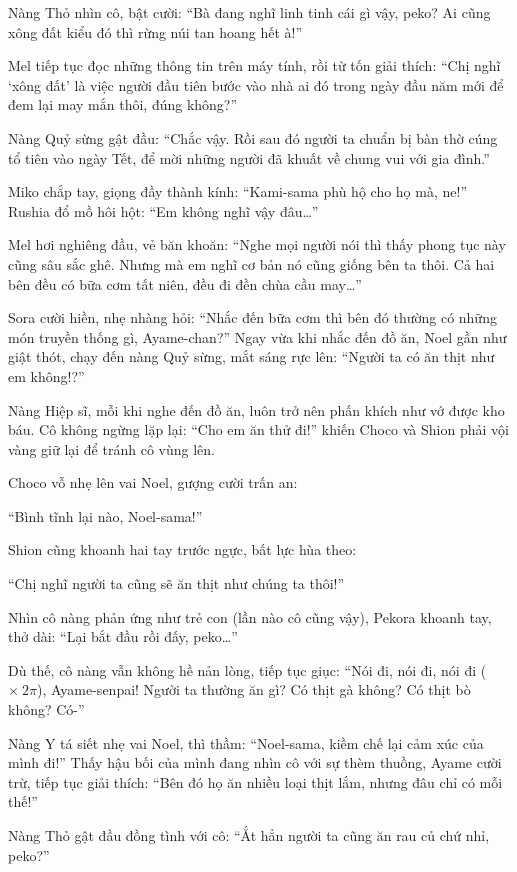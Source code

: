\documentclass[../main.tex]{subfiles}
\begin{document}
Nàng Thỏ nhìn cô, bật cười: ``Bà đang nghĩ linh tinh cái gì vậy, peko? Ai cũng xông đất kiểu đó thì rừng núi tan hoang hết à!''

Mel tiếp tục đọc những thông tin trên máy tính, rồi từ tốn giải thích: ``Chị nghĩ `xông đất' là việc người đầu tiên bước vào nhà ai đó trong ngày đầu năm mới để đem lại may mắn thôi, đúng không?''

Nàng Quỷ sừng gật đầu: ``Chắc vậy. Rồi sau đó người ta chuẩn bị bàn thờ cúng tổ tiên vào ngày Tết, để mời những người đã khuất về chung vui với gia đình.''

Miko chắp tay, giọng đầy thành kính: ``Kami-sama phù hộ cho họ mà, ne!'' Rushia đổ mồ hôi hột: ``Em không nghĩ vậy đâu\dots''

Mel hơi nghiêng đầu, vẻ băn khoăn: ``Nghe mọi người nói thì thấy phong tục này cũng sâu sắc ghê. Nhưng mà em nghĩ cơ bản nó cũng giống bên ta thôi. Cả hai bên đều có bữa cơm tất niên, đều đi đền chùa cầu may\dots''

Sora cười hiền, nhẹ nhàng hỏi: ``Nhắc đến bữa cơm thì bên đó thường có những món truyền thống gì, Ayame-chan?'' Ngay vừa khi nhắc đến đồ ăn, Noel gần như giật thót, chạy đến nàng Quỷ sừng, mắt sáng rực lên: ``Người ta có ăn thịt như em không!?''

Nàng Hiệp sĩ, mỗi khi nghe đến đồ ăn, luôn trở nên phấn khích như vớ được kho báu. Cô không ngừng lặp lại: ``Cho em ăn thử đi!'' khiến Choco và Shion phải vội vàng giữ lại để tránh cô vùng lên.

Choco vỗ nhẹ lên vai Noel, gượng cười trấn an:

``Bình tĩnh lại nào, Noel-sama!''

Shion cũng khoanh hai tay trước ngực, bất lực hùa theo:

``Chị nghĩ người ta cũng sẽ ăn thịt như chúng ta thôi!''

Nhìn cô nàng phản ứng như trẻ con (lần nào cô cũng vậy), Pekora khoanh tay, thở dài: ``Lại bắt đầu rồi đấy, peko\dots''

Dù thế, cô nàng vẫn không hề nản lòng, tiếp tục giục: ``Nói đi, nói đi, nói đi ($ \times\ 2\pi $), Ayame-senpai! Người ta thường ăn gì? Có thịt gà không? Có thịt bò không? Có-''

Nàng Y tá siết nhẹ vai Noel, thì thầm: ``Noel-sama, kiềm chế lại cảm xúc của mình đi!'' Thấy hậu bối của mình đang nhìn cô với sự thèm thuồng, Ayame cười trừ, tiếp tục giải thích: ``Bên đó họ ăn nhiều loại thịt lắm, nhưng đâu chỉ có mỗi thế!''

Nàng Thỏ gật đầu đồng tình với cô: ``Ắt hẳn người ta cũng ăn rau củ chứ nhỉ, peko?''
\end{document}
